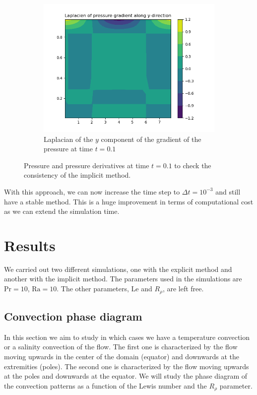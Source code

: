 \documentclass{article}
\def\Ra{\mathrm{Ra}}
\def\Pr{\mathrm{Pr}}
\def\Le{\mathrm{Le}}
\begin{document}
\begin{figure}[ht]
\begin{subfigure}{0.32\textwidth}
    \centering
    \includegraphics[width=\textwidth]{images/pressure_data/laplacian_gradient_y.png}
    \caption{Laplacian of the $y$ component of the gradient of the pressure at time $t=0.1$}
  \end{subfigure}
  \caption{Pressure and pressure derivatives at time $t=0.1$ to check the consistency of the implicit method.}
  \label{fig:pressure}
\end{figure}

With this approach, we can now increase the time step to $\Delta t = 10^{-3}$ and still have a stable method. This is a huge improvement in terms of computational cost as we can extend the simulation time.

\section{Results}
We carried out two different simulations, one with the explicit method and another with the implicit method. The parameters used in the simulations are $\Pr = 10$, $\Ra = 10$. The other parameters, $\Le$ and $R_{\rho}$, are left free.

\subsection{Convection phase diagram}
In this section we aim to study in which cases we have a temperature convection or a salinity convection of the flow. The first one is characterized by the flow moving upwards in the center of the domain (equator) and downwards at the extremities (poles). The second one is characterized by the flow moving upwards at the poles and downwards at the equator. We will study the phase diagram of the convection patterns as a function of the Lewis number and the $R_{\rho}$ parameter.
\end{document}
